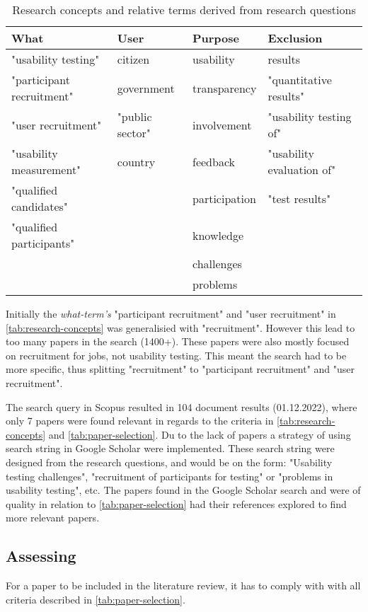 \begin{table}[H]
\centering
\begin{tabular}{llll}
\hline
\textbf{What} & \textbf{User} & \textbf{Purpose} & \textbf{Exclusion} \\ \hline
"usability testing" & citizen & usability & results \\
"participant recruitment" & government & transparency & "quantitative results"  \\
"user recruitment" & "public sector" & involvement & "usability testing of" \\
"usability measurement" & country & feedback & "usability evaluation of" \\
"qualified candidates" &  & participation & "test results" \\
"qualified participants" &  & knowledge &   \\
 & & challenges & \\
 & & problems & \\ \hline
\end{tabular}
\caption{Research concepts and relative terms derived from research questions}
\label{tab:research-concepts}
\end{table}

Initially the \textit{what-term's} "participant recruitment" and "user recruitment" in \autoref{tab:research-concepts} was generalisied with "recruitment". However this lead to too many papers in the search (1400+). These papers were also mostly focused on recruitment for jobs, not usability testing. This meant the search had to be more specific, thus splitting "recruitment" to "participant recruitment" and "user recruitment".

The search query in Scopus resulted in 104 document results (01.12.2022), where only 7 papers were found relevant in regards to the criteria in \autoref{tab:research-concepts} and \autoref{tab:paper-selection}. Du to the lack of papers a strategy of using search string in Google Scholar were implemented. These search string were designed from the research questions, and would be on the form: "Usability testing challenges", "recruitment of participants for testing" or "problems in usability testing", etc. The papers found in the Google Scholar search and were of quality in relation to \autoref{tab:paper-selection} had their references explored to find more relevant papers.


\subsection{Assessing} \label{sec:assessing}
For a paper to be included in the literature review, it has to comply with with all criteria described in \autoref{tab:paper-selection}. 

